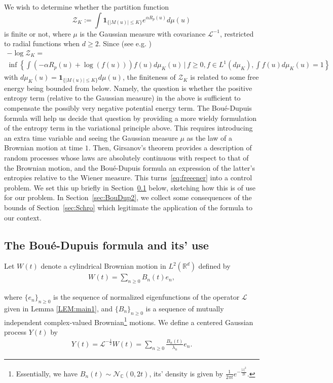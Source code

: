 \documentclass[%
11pt,  reqno]{amsart}
\theoremstyle{remarkstyle}
\newcommand{\1}{\hspace{0.2mm}\text{I}\hspace{0.2mm}}
\newcommand{\noi}{\noindent}
\newcommand{\R}{\mathbb{R}}
\renewcommand{\L}{\mathcal{L}}
\newcommand{\al}{\alpha}
\newcommand{\ld}{\lambda}
\newcommand{\ind}{\mathbf 1}
\numberwithin{equation}{section}
\numberwithin{theorem}{section}
\newcommand{\cZ}{\mathcal{Z}}
\begin{document}
	We wish to determine whether the partition function
	\[
	\cZ_K := \int \ind_{\{|M(u)|\leq K\}} e^{\al R_p(u)} d\mu (u) 
	\]
	is finite or not, where $\mu$ is the Gaussian measure with covariance $\L^{-1}$, restricted to radial functions when $d\geq 2$. Since (see e.g. \cite[Proposition 2.5]{BD98})
	\begin{multline}\label{eq:freeener} 
		- \log \cZ_K = \\
		\inf\left\{ \int \left(-\al R_p(u) +\log (f(u)) \right) f(u) d\mu_K (u) \,|\, f\geq 0, f \in L^1(d\mu_K), \int f (u) d\mu_K (u)= 1 \right\}
	\end{multline}
	with $d\mu_K (u) = \ind_{\{|M(u)|\leq K\}} d\mu (u)$, the finiteness of $\cZ_K$ is related to some free energy being bounded from below. Namely, the question is whether the positive entropy term (relative to the Gaussian measure) in the above is sufficient to compensate the possibly very negative potential energy term. The Bou\'e-Dupuis formula will help us decide that question by providing a more wieldy formulation of the entropy term in the variational principle above. This requires introducing an extra time variable and seeing the Gaussian measure $\mu$ as the law of a Brownian motion at time $1$. Then, Girsanov's theorem provides a description of random processes whose laws are absolutely continuous with respect to that of the Brownian motion, and the Bou\'e-Dupuis formula an expression of the latter's entropies relative to the Wiener measure. This turns~\eqref{eq:freeener} into a control problem. We set this up briefly in Section~\ref{sec:BouDup1} below, sketching how this is of use for our problem. In Section~\ref{sec:BouDup2}, we collect some consequences of the bounds of Section~\ref{sec:Schro} which legitimate the application of the formula to our context. 
	
	\subsection{The Bou\'e-Dupuis formula and its' use}\label{sec:BouDup1}
	
	Let $W(t)$ denote a cylindrical Brownian motion in $L^2(\R^d)$ defined by
	\begin{align}
		\label{Bro}
		W(t) = \sum_{n\ge 0} B_n (t) e_n,
	\end{align}
	
	\noi
	where $\{e_n\}_{n\ge 0}$ is the sequence of normalized eigenfunctions of the operator $\mathcal L$ given in Lemma \ref{LEM:main1}, 
	and $\{B_n\}_{n \ge 0}$ is a sequence of mutually independent complex-valued Brownian\footnote{Essentially, we have $B_n(t) \sim \mathcal N_{\mathbb C}(0,2t)$, its' density is given by $\frac{1}{2\pi t} e^{-\frac{|z|^2}{2t}}$.} motions.
	We define a centered Gaussian process $Y(t)$ by
	\begin{align}
		\label{Yt}
		Y (t) = \L^{-\frac12} W(t) = \sum_{n\ge 0} \frac{B_n (t)}{\ld_n} e_n.
	\end{align}
	
\end{document}
